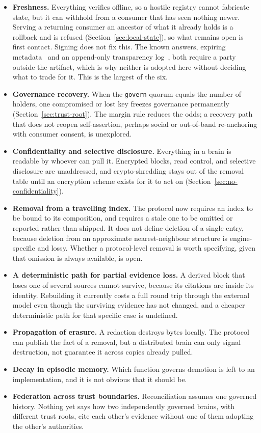 \documentclass[11pt,a4paper]{article}
\begin{document}
\begin{itemize}[leftmargin=1.4em]
  \item \textbf{Freshness.} Everything verifies offline, so a hostile registry
cannot fabricate state, but it can withhold from a consumer that has seen
nothing newer. Serving a returning consumer an ancestor of what it already
holds is a rollback and is refused (Section~\ref{sec:local-state}), so what
remains open is first contact. Signing does not fix this. The known answers,
  expiring metadata~\cite{samuel2010tuf} and an append-only transparency
  log~\cite{rfc9162}, both require a party outside the artifact, which is why
  neither is adopted here without deciding what to trade for it. This is the
  largest of the six.
  \item \textbf{Governance recovery.} When the \texttt{govern} quorum
  equals the number of holders, one compromised or lost key freezes
  governance permanently (Section~\ref{sec:trust-root}). The margin rule
  reduces the odds; a recovery path that does not reopen self-assertion,
  perhaps social or out-of-band re-anchoring with consumer consent, is
  unexplored.
  \item \textbf{Confidentiality and selective disclosure.} Everything in a
  brain is readable by whoever can pull it. Encrypted blocks, read control,
  and selective disclosure are unaddressed, and crypto-shredding stays out of
  the removal table until an encryption scheme exists for it to act on
  (Section~\ref{sec:no-confidentiality}).
  \item \textbf{Removal from a travelling index.} The protocol now requires an
  index to be bound to its composition, and requires a stale one to be omitted
  or reported rather than shipped. It does not define deletion of a single entry,
  because deletion from an approximate nearest-neighbour structure is
  engine-specific and lossy. Whether a protocol-level removal is worth
  specifying, given that omission is always available, is open.
  \item \textbf{A deterministic path for partial evidence loss.} A derived block
  that loses one of several sources cannot survive, because its citations are
  inside its identity. Rebuilding it currently costs a full round trip through
  the external model even though the surviving evidence has not changed, and a
  cheaper deterministic path for that specific case is undefined.
  \item \textbf{Propagation of erasure.} A redaction destroys bytes locally. The
  protocol can publish the fact of a removal, but a distributed brain can only
  signal destruction, not guarantee it across copies already pulled.
  \item \textbf{Decay in episodic memory.} Which function governs demotion is
  left to an implementation, and it is not obvious that it should be.
  \item \textbf{Federation across trust boundaries.} Reconciliation assumes one
  governed history. Nothing yet says how two independently governed brains, with
  different trust roots, cite each other's evidence without one of them adopting
  the other's authorities.
\end{itemize}
\end{document}
